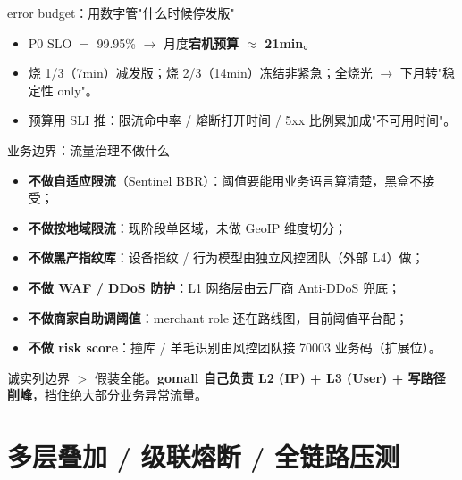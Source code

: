 \documentclass[aspectratio=169,11pt]{beamer}
\begin{document}
\begin{frame}[shrink]{error budget：用数字管"什么时候停发版"}
\begin{itemize}
  \item P0 SLO $=$ 99.95\% $\to$ 月度\textbf{宕机预算 $\approx$ 21min}。
  \item 烧 1/3（7min）减发版；烧 2/3（14min）冻结非紧急；全烧光 $\to$ 下月转"稳定性 only"。
  \item 预算用 SLI 推：限流命中率 / 熔断打开时间 / 5xx 比例累加成"不可用时间"。
\end{itemize}
\end{frame}

\begin{frame}[shrink]{业务边界：流量治理不做什么}
\begin{itemize}
  \item \textbf{不做自适应限流}（Sentinel BBR）：阈值要能用业务语言算清楚，黑盒不接受；
  \item \textbf{不做按地域限流}：现阶段单区域，未做 GeoIP 维度切分；
  \item \textbf{不做黑产指纹库}：设备指纹 / 行为模型由独立风控团队（外部 L4）做；
  \item \textbf{不做 WAF / DDoS 防护}：L1 网络层由云厂商 Anti-DDoS 兜底；
  \item \textbf{不做商家自助调阈值}：merchant role 还在路线图，目前阈值平台配；
  \item \textbf{不做 risk score}：撞库 / 羊毛识别由风控团队接 70003 业务码（扩展位）。
\end{itemize}
\vspace{1mm}
\small 诚实列边界 $>$ 假装全能。\textbf{gomall 自己负责 L2 (IP) + L3 (User) + 写路径削峰}，挡住绝大部分业务异常流量。
\end{frame}

\section{多层叠加 / 级联熔断 / 全链路压测}
\end{document}
